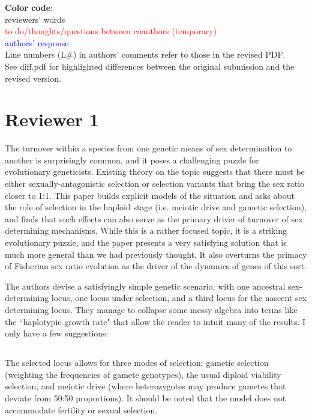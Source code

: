 \documentclass[10pt,letterpaper]{article}
\begin{document}
\noindent\textbf{Color code}:\\
reviewers' words\\
\textcolor{red}{to do/thoughts/questions between coauthors (temporary)}\\
\textcolor{blue}{authors' response}
\\

\noindent  Line numbers (L\#) in authors' comments refer to those in the revised PDF.
\\

\noindent See diff.pdf for highlighted differences between the original submission and the revised version.

\section{Reviewer 1}

The turnover within a species from one genetic means of sex determination to another is surprisingly common, and it poses a challenging puzzle for evolutionary geneticists.  Existing theory on the topic suggests that there must be either sexually-antagonistic selection or selection variants that bring the sex ratio closer to 1:1.  This paper builds explicit models of the situation and asks about the role of selection in the haploid stage (i.e. meiotic drive and gametic selection), and finds that such effects can also serve as the primary driver of turnover of sex determining mechanisms.  While this is a rather focused topic, it is a striking evolutionary puzzle, and the paper presents a very satisfying solution that is much more general than we had previously thought.  It also overturns the primacy of Fisherian sex ratio evolution as the driver of the dynamics of genes of this sort.

The authors devise a satisfyingly simple genetic scenario, with one ancestral sex-determining locus, one locus under selection, and a third locus for the nascent sex determining locus.  They manage to collapse some messy algebra into terms like the ``haplotypic growth rate" that allow the reader to intuit many of the results.  I only have a few suggestions:

\noindent\subsection{}
The selected locus allows for three modes of selection: gametic selection (weighting the frequencies of gamete genotypes), the usual diploid viability selection, and meiotic drive (where heterozygotes may produce gametes that deviate from 50:50 proportions).  It should be noted that the model does not accommodate fertility or sexual selection.
\end{document}
